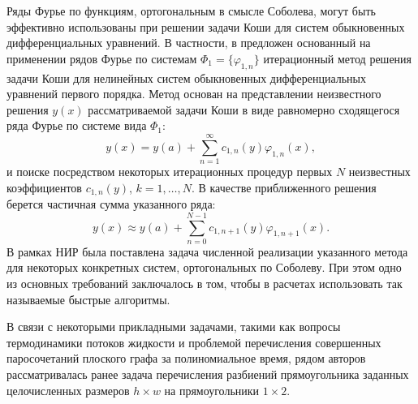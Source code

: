 Ряды Фурье по функциям, ортогональным в смысле Соболева, могут быть эффективно использованы при решении задачи Коши для систем обыкновенных дифференциальных уравнений. В частности, в \cite{mmgmsr1-ShaOdeDemi2017,mmgmsr1-ShaMagOdeCos2017,mmgmsr1-SMS-SHTI-Demi2017,mmgmsr1-SHII-MSR-Demi2017} предложен основанный на применении рядов Фурье по системам $\Phi_1=\{\varphi_{1,n}\}$ итерационный метод решения задачи Коши для нелинейных систем обыкновенных дифференциальных уравнений первого порядка. Метод основан на представлении неизвестного решения $y(x)$ рассматриваемой задачи Коши в виде равномерно сходящегося ряда Фурье по системе вида $\Phi_1$:
\begin{equation*}
y(x) = y(a)+\sum\limits_{n=1}^{\infty}
c_{1,n}(y)\varphi_{1,n}(x),
\end{equation*}
и поиске посредством некоторых итерационных процедур первых $N$ неизвестных коэффициентов $c_{1,n}(y)$, $k=1,\ldots,N$. В качестве приближенного решения берется частичная сумма указанного ряда:
\begin{equation}\label{mmgmsr1-y-part-sum}
y(x) \approx y(a)+\sum\limits_{n=0}^{N-1}
c_{1,n+1}(y)\varphi_{1,n+1}(x).
\end{equation}
В рамках НИР была поставлена задача численной реализации указанного метода для некоторых конкретных систем, ортогональных по Соболеву. При этом одно из основных требований заключалось в том, чтобы в расчетах использовать так называемые быстрые алгоритмы. 













В связи с некоторыми прикладными задачами, такими как вопросы термодинамики потоков жидкости и проблемой перечисления совершенных паросочетаний плоского графа за полиномиальное время, рядом авторов рассматривалась ранее задача перечисления разбиений прямоугольника заданных целочисленных размеров $h\times w$ на прямоугольники $1\times 2$.

